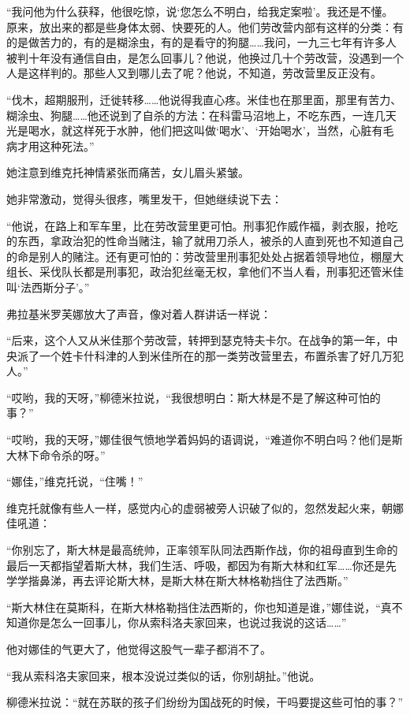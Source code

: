 “我问他为什么获释，他很吃惊，说‘您怎么不明白，给我定案啦’。我还是不懂。原来，放出来的都是些身体太弱、快要死的人。他们劳改营内部有这样的分类：有的是做苦力的，有的是糊涂虫，有的是看守的狗腿……我问，一九三七年有许多人被判十年没有通信自由，是怎么回事儿？他说，他换过几十个劳改营，没遇到一个人是这样判的。那些人又到哪儿去了呢？他说，不知道，劳改营里反正没有。

“伐木，超期服刑，迁徙转移……他说得我直心疼。米佳也在那里面，那里有苦力、糊涂虫、狗腿……他还说到了自杀的方法：在科雷马沼地上，不吃东西，一连几天光是喝水，就这样死于水肿，他们把这叫做‘喝水’、‘开始喝水’，当然，心脏有毛病才用这种死法。”

她注意到维克托神情紧张而痛苦，女儿眉头紧皱。

她非常激动，觉得头很疼，嘴里发干，但她继续说下去：

“他说，在路上和军车里，比在劳改营里更可怕。刑事犯作威作福，剥衣服，抢吃的东西，拿政治犯的性命当赌注，输了就用刀杀人，被杀的人直到死也不知道自己的命是别人的赌注。还有更可怕的：劳改营里刑事犯处处占据着领导地位，棚屋大组长、采伐队长都是刑事犯，政治犯丝毫无权，拿他们不当人看，刑事犯还管米佳叫‘法西斯分子’。”

弗拉基米罗芙娜放大了声音，像对着人群讲话一样说：

“后来，这个人又从米佳那个劳改营，转押到瑟克特夫卡尔。在战争的第一年，中央派了一个姓卡什科津的人到米佳所在的那一类劳改营里去，布置杀害了好几万犯人。”

“哎哟，我的天呀，”柳德米拉说，“我很想明白：斯大林是不是了解这种可怕的事？”

“哎哟，我的天呀，”娜佳很气愤地学着妈妈的语调说，“难道你不明白吗？他们是斯大林下命令杀的呀。”

“娜佳，”维克托说，“住嘴！”

维克托就像有些人一样，感觉内心的虚弱被旁人识破了似的，忽然发起火来，朝娜佳吼道：

“你别忘了，斯大林是最高统帅，正率领军队同法西斯作战，你的祖母直到生命的最后一天都指望着斯大林，我们生活、呼吸，都因为有斯大林和红军……你还是先学学揩鼻涕，再去评论斯大林，是斯大林在斯大林格勒挡住了法西斯。”

“斯大林住在莫斯科，在斯大林格勒挡住法西斯的，你也知道是谁，”娜佳说，“真不知道你是怎么一回事儿，你从索科洛夫家回来，也说过我说的这话……”

他对娜佳的气更大了，他觉得这股气一辈子都消不了。

“我从索科洛夫家回来，根本没说过类似的话，你别胡扯。”他说。

柳德米拉说：“就在苏联的孩子们纷纷为国战死的时候，干吗要提这些可怕的事？”

